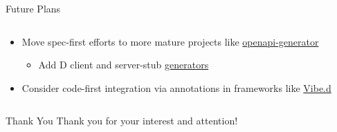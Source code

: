 \documentclass[bigger]{beamer}
\begin{document}
\begin{frame}[label={sec:org37a7e42}]{Future Plans}
\begin{columns}
\begin{column}{0.5\columnwidth}
\begin{itemize}
\item Move spec-first efforts to more mature projects like \href{https://github.com/OpenAPITools/openapi-generator}{openapi-generator}
\begin{itemize}
\item Add D client and server-stub \href{https://github.com/OpenAPITools/openapi-generator/wiki/How-to-add-a-generator-for-a-new-language-or-framework}{generators}
\end{itemize}
\item Consider code-first integration via annotations in frameworks like \href{https://vibed.org/}{Vibe.d}
\end{itemize}
\end{column}

\begin{column}{0.5\columnwidth}
\resizebox{\textwidth}{!}{
\begin{center}

\end{center}
}
\end{column}
\end{columns}
\end{frame}

\begin{frame}[label={sec:org3485a40}]{Thank You}
Thank you for your interest and attention!
\end{frame}
\end{document}
